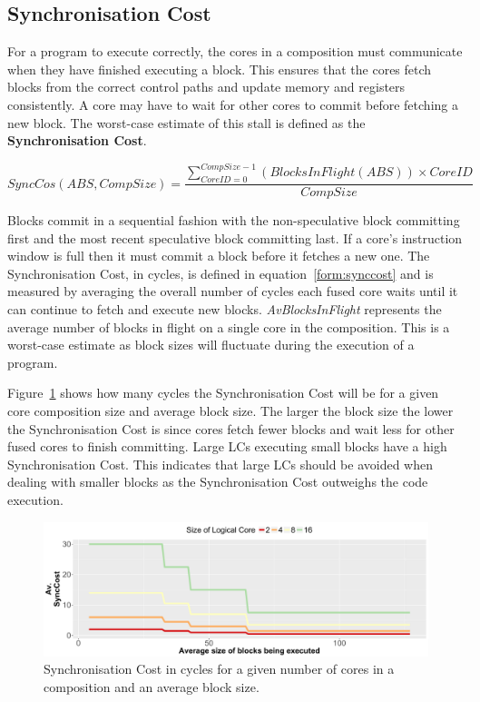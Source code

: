 \subsection{Synchronisation Cost}

For a program to execute correctly, the cores in a composition must communicate when they have finished executing a block.
This ensures that the cores fetch blocks from the correct control paths and update memory and registers consistently.
A core may have to wait for other cores to commit before fetching a new block. 
The worst-case estimate of this stall is defined as the \textbf{Synchronisation Cost}.

\begin{equation}\label{form:synccost}
SyncCos(ABS,CompSize) = \frac{\sum_{CoreID=0}^{CompSize-1}\left(BlocksInFlight(ABS)\right) \times CoreID }{CompSize}
\end{equation}


Blocks commit in a sequential fashion with the non-speculative block committing first and the most recent speculative block committing last.
If a core's instruction window is full then it must commit a block before it fetches a new one.
The Synchronisation Cost, in cycles, is defined in equation~\ref{form:synccost} and is measured by averaging the overall number of cycles each fused core waits until it can continue to fetch and execute new blocks.
\textit{AvBlocksInFlight} represents the average number of blocks in flight on a single core in the composition.
This is a worst-case estimate as block sizes will fluctuate during the execution of a program.

Figure~\ref{fig:sync_cost} shows how many cycles the Synchronisation Cost will be for a given core composition size and average block size.
The larger the block size the lower the Synchronisation Cost is since cores fetch fewer blocks and wait less for other fused cores to finish committing.
Large LCs executing small blocks have a high Synchronisation Cost. 
This indicates that large LCs should be avoided when dealing with smaller blocks as the Synchronisation Cost outweighs the code execution.

\begin{figure}[t]
    \centering
    \includegraphics[width=\textwidth]{cases-paper/graphics/limit_study/sync_cost.pdf}

    \caption{Synchronisation Cost in cycles for a given number of cores in a composition and an average block size.} %
    \label{fig:sync_cost}
	\vspace{1em}
\end{figure}


